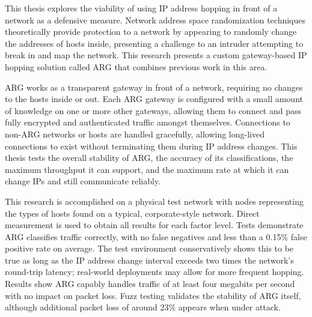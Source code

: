 \par This thesis explores the viability of using \ac{IP} address hopping in front of a network as a defensive measure. Network address space randomization techniques theoretically provide protection to a network by appearing to randomly change the addresses of hosts inside, presenting a challenge to an intruder attempting to break in and map the network. This research presents a custom gateway-based \ac{IP} hopping solution called \ac{ARG} that combines previous work in this area.

\par \ac{ARG} works as a transparent gateway in front of a network, requiring no changes to the hosts inside or out. Each \ac{ARG} gateway is configured with a small amount of knowledge on one or more other gateways, allowing them to connect and pass fully encrypted and authenticated traffic amongst themselves. Connections to non-\ac{ARG} networks or hosts are handled gracefully, allowing long-lived connections to exist without terminating them during \ac{IP} address changes. This thesis tests the overall stability of \ac{ARG}, the accuracy of its classifications, the maximum throughput it can support, and the maximum rate at which it can change \acp{IP} and still communicate reliably.

\par This research is accomplished on a physical test network with nodes representing the types of hosts found on a typical, corporate-style network. Direct measurement is used to obtain all results for each factor level. Tests demonstrate \ac{ARG} classifies traffic correctly, with no false negatives and less than a 0.15\% false positive rate on average. The test environment conservatively shows this to be true as long as the \ac{IP} address change interval exceeds two times the network's round-trip latency; real-world deployments may allow for more frequent hopping. Results show \ac{ARG} capably handles traffic of at least four megabits per second with no impact on packet loss. Fuzz testing validates the stability of \ac{ARG} itself, although additional packet loss of around 23\% appears when under attack.

\acresetall

